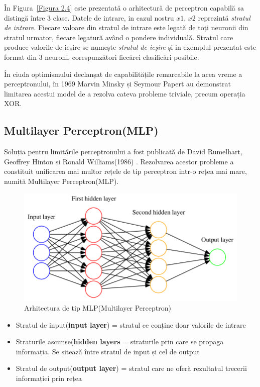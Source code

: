 În Figura~\ref{Figura 2.4} este prezentată o arhitectură de perceptron capabilă sa distingă între 3 clase. Datele de intrare, in cazul nostru $x1$, $x2$ reprezintă \textit{stratul de intrare}. Fiecare valoare din stratul de intrare este legată de toți neuronii din stratul urmator, fiecare legatură având o pondere individuală. Stratul care produce valorile de ieșire se numește \textit{stratul de ieșire} și in exemplul prezentat este format din 3 neuroni, corespunzători fiecărei clasificări posibile. 

În ciuda optimismului declanșat de capabilitățile remarcabile la acea vreme a perceptronului, în 1969 Marvin Minsky și Seymour Papert \cite{minsky1969introduction} au demonstrat limitarea acestui model de a rezolva cateva probleme triviale, precum operația XOR. 

\subsection{Multilayer Perceptron(MLP)}

Soluția pentru limitările perceptronului a fost publicată de David Rumelhart, Geoffrey Hinton și Ronald Williams(1986) \cite{rumelhart1986learning}. Rezolvarea acestor probleme a constituit unificarea mai multor rețele de tip perceptron intr-o rețea mai mare, numită Multilayer Perceptron(MLP).


\begin{figure}[h]
         \centering 
         \includegraphics[width=.6\linewidth]{images/MLP.png}
         \captionsetup{font=footnotesize}
         \caption{Arhitectura de tip MLP(Multilayer Perceptron) \cite{phdthesis}}
\end{figure}

\begin{itemize}
    \item Stratul de input(\textbf{input layer}) = stratul ce conține doar valorile de intrare
    \item Straturile ascunse(\textbf{hidden layers} = straturile prin care se propaga informația. Se sitează între stratul de input și cel de output
    \item Stratul de output(\textbf{output layer}) = stratul care ne oferă rezultatul trecerii informației prin rețea
\end{itemize}

